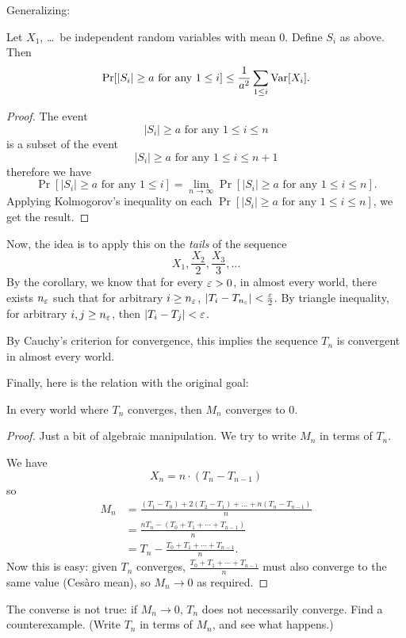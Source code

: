 Generalizing:
\begin{corollary}
	Let $X_1$, \dots\ be independent random variables with mean $0$. Define $S_i$ as above. Then
	\[ \Pr[|S_i| \geq a \text{ for any }1 \leq i] \leq \frac{1}{a^2} \sum_{1 \leq i} \operatorname{Var}[X_i]. \]
\end{corollary}
\begin{proof}
	The event
	\[ |S_i| \geq a \text{ for any }1 \leq i \leq n \]
	is a subset of the event
	\[ |S_i| \geq a \text{ for any }1 \leq i \leq n+1 \]
	therefore we have
	\[ \Pr[|S_i| \geq a \text{ for any }1 \leq i]
	= \lim_{n \to \infty} \Pr[|S_i| \geq a \text{ for any }1 \leq i \leq n]. \]
	Applying Kolmogorov's inequality on each $\Pr[|S_i| \geq a \text{ for any }1 \leq i \leq n]$,
	we get the result.
\end{proof}

Now, the idea is to apply this on the \emph{tails} of the sequence
\[ X_1, \frac{X_2}{2}, \frac{X_3}{3}, \dots \]
By the corollary, we know that for every $\varepsilon>0$, in almost every world,
there exists $n_\varepsilon$ such that for arbitrary $i \geq n_\varepsilon$,
$|T_i-T_{n_\varepsilon}|<\frac{\varepsilon}{2}$. By triangle inequality, for arbitrary $i, j \geq n_\varepsilon$,
then $|T_i-T_j|<\varepsilon$.

By Cauchy's criterion for convergence,
this implies the sequence $T_n$ is convergent in almost every world.

Finally, here is the relation with the original goal:
\begin{claim}
	In every world where $T_n$ converges, then $M_n$ converges to $0$.
\end{claim}

\begin{proof}
	Just a bit of algebraic manipulation.
	We try to write $M_n$ in terms of $T_n$.

	We have
	\[ X_n = n \cdot (T_n-T_{n-1}) \]
	so
	\begin{align*}
		M_n &= \frac{(T_1-T_0) +2(T_2-T_1) + \dots + n(T_n-T_{n-1})}{n} \\
			&= \frac{n T_n - (T_0+T_1+\cdots+T_{n-1})}{n} \\
			&= T_n - \frac{T_0+T_1+\cdots+T_{n-1}}{n}.
	\end{align*}
	Now this is easy: given $T_n$ converges,
	$\frac{T_0+T_1+\cdots+T_{n-1}}{n}$ must also converge to the same value (Ces\`aro mean),
	so $M_n \to 0$ as required.
\end{proof}

\begin{exercise}
	The converse is not true: if $M_n \to 0$, $T_n$ does not necessarily converge.
	Find a counterexample. (Write $T_n$ in terms of $M_n$, and see what happens.)
\end{exercise}

